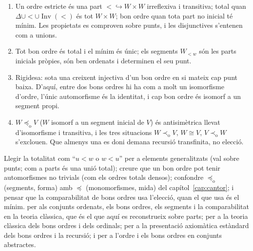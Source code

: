 \begin{resumcap}
\begin{enumerate}
  \item Un ordre estricte és una part \({<}\hookrightarrow W\times W\) irreflexiva i transitiva; total quan \(\Delta\cup{<}\cup\operatorname{Inv}(<)\) és tot \(W\times W\); bon ordre quan tota part no inicial té mínim. Les propietats es comproven sobre punts, i les disjunctives s'entenen com a unions.
  \item Tot bon ordre és total i el mínim és únic; els segments \(W_{<w}\) són les parts inicials pròpies, són ben ordenats i determinen el seu punt.
  \item Rigidesa: sota una creixent injectiva d'un bon ordre en si mateix cap punt baixa. D'aquí, entre dos bons ordres hi ha com a molt un isomorfisme d'ordre, l'únic automorfisme és la identitat, i cap bon ordre és isomorf a un segment propi.
  \item \(W\preceq_{\mathrm o}V\) (\(W\) isomorf a un segment inicial de \(V\)) és antisimètrica llevat d'isomorfisme i transitiva, i les tres situacions \(W\prec_{\mathrm o}V\), \(W\cong V\), \(V\prec_{\mathrm o}W\) s'exclouen. Que almenys una es doni demana recursió transfinita, no elecció.
\end{enumerate}
 Llegir la totalitat com \enquote{\(u<w\) o \(w<u\)} per a elements generalitzats (val sobre punts; com a parts és una unió total); creure que un bon ordre pot tenir automorfismes no trivials (com els ordres totals densos); confondre \(\preceq_{\mathrm o}\) (segments, forma) amb \(\preceq\) (monomorfismes, mida) del capítol~\ref{cap:cantor}; i pensar que la comparabilitat de bons ordres usa l'elecció, quan el que usa és el mínim.
 \cite[§§14 i 17]{halmos} per als conjunts ordenats, els bons ordres, els segments i la comparabilitat en la teoria clàssica, que és el que aquí es reconstrueix sobre parts; \cite[cap.~2]{jech2003} per a la teoria clàssica dels bons ordres i dels ordinals; \cite[cap.~I.6--I.7]{kunen2011} per a la presentació axiomàtica estàndard dels bons ordres i la recursió; i \cite[§§8.4--8.5]{lawvere-rosebrugh} per a l'ordre i els bons ordres en conjunts abstractes.
\end{resumcap}
